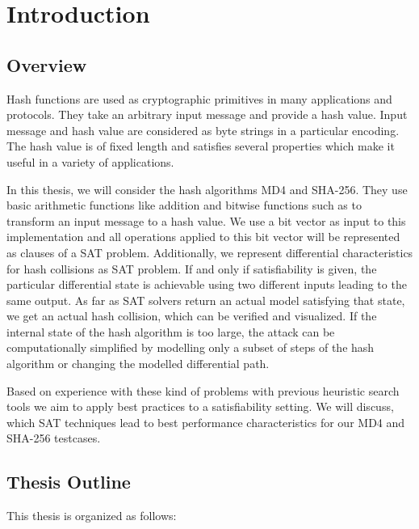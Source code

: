 \renewcommand*\chappic{img/intro.pdf}
\renewcommand*\chapquote{}
\renewcommand*\chapquotesrc{}
%
\chapter{Introduction}
\label{ch:intro}
\section{Overview}
\label{sec:intro-overview}
%
Hash functions are used as cryptographic primitives in many applications and protocols.
They take an arbitrary input message and provide a hash value. Input message and hash value
are considered as byte strings in a particular encoding.
The hash value is of fixed length and satisfies several properties which make it useful
in a variety of applications.

In this thesis, we will consider the hash algorithms MD4 and SHA-256.
They use basic arithmetic functions like addition and bitwise functions
such as  to transform an input message to a hash value. We use a bit vector
as input to this implementation and all operations applied to this bit vector
will be represented as clauses of a SAT problem. Additionally, we represent
differential characteristics for hash collisions as SAT problem. If and only if
satisfiability is given, the particular differential state is achievable
using two different inputs leading to the same output. As far as SAT solvers
return an actual model satisfying that state, we get an actual hash collision,
which can be verified and visualized.
If the internal state of the hash algorithm is too large, the attack can be
computationally simplified by modelling only a subset of steps of the hash algorithm
or changing the modelled differential path.

Based on experience with these kind of problems with previous heuristic search tools
we aim to apply best practices to a satisfiability setting.
We will discuss, which SAT techniques lead to best performance characteristics
for our MD4 and SHA-256 testcases.

\section{Thesis Outline}
\label{sec:intro-outline}
%
This thesis is organized as follows:

